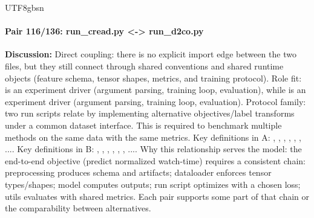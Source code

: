 \documentclass[11pt]{article}
\begin{document}
\begin{CJK*}{UTF8}{gbsn}
\paragraph{Pair 116/136: run\_cread.py <-> run\_d2co.py}
\textbf{Discussion:} Direct coupling: there is no explicit import edge between the two files, but they still connect through shared conventions and shared runtime objects (feature schema, tensor shapes, metrics, and training protocol). Role fit: \texttt{} is an experiment driver (argument parsing, training loop, evaluation), while \texttt{} is an experiment driver (argument parsing, training loop, evaluation). Protocol family: two run scripts relate by implementing alternative objectives/label transforms under a common dataset interface. This is required to benchmark multiple methods on the same data with the same metrics. Key definitions in A: \texttt{}, \texttt{}, \texttt{}, \texttt{}, \texttt{}, \texttt{}, .... Key definitions in B: \texttt{}, \texttt{}, \texttt{}, \texttt{}, \texttt{}, \texttt{}, .... Why this relationship serves the model: the end-to-end objective (predict normalized watch-time) requires a consistent chain: preprocessing produces schema and artifacts; dataloader enforces tensor types/shapes; model computes outputs; run script optimizes with a chosen loss; utils evaluates with shared metrics. Each pair supports some part of that chain or the comparability between alternatives.


\end{CJK*}
\end{document}
